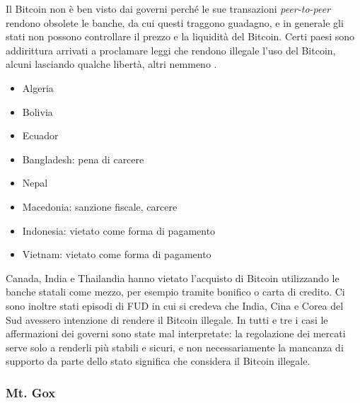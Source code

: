 \documentclass {article}
\begin{document}
Il Bitcoin non è ben visto dai governi perché le sue transazioni \textit{peer-to-peer} rendono obsolete le banche, da cui questi traggono guadagno, e in generale gli stati non possono controllare il prezzo e la liquidità del Bitcoin.
Certi paesi sono addirittura arrivati a proclamare leggi che rendono illegale l'uso del Bitcoin, alcuni lasciando qualche libertà, altri nemmeno \cite{legality}.

\begin{itemize}
\item Algeria
\item Bolivia
\item Ecuador
\item Bangladesh: pena di carcere
\item Nepal
\item Macedonia: sanzione fiscale, carcere
\item Indonesia: vietato come forma di pagamento
\item Vietnam: vietato come forma di pagamento
\end{itemize}
%
Canada, India e Thailandia hanno vietato l'acquisto di Bitcoin utilizzando le banche statali come mezzo, per esempio tramite bonifico o carta di credito.
Ci sono inoltre stati episodi di FUD in cui si credeva che India, Cina e Corea del Sud avessero intenzione di rendere il Bitcoin illegale.
In tutti e tre i casi le affermazioni dei governi sono state mal interpretate: la regolazione dei mercati serve solo a renderli più stabili e sicuri, e non necessariamente la mancanza di supporto da parte dello stato significa che considera il Bitcoin illegale.
%


\subsubsection {Mt. Gox}
\end{document}
